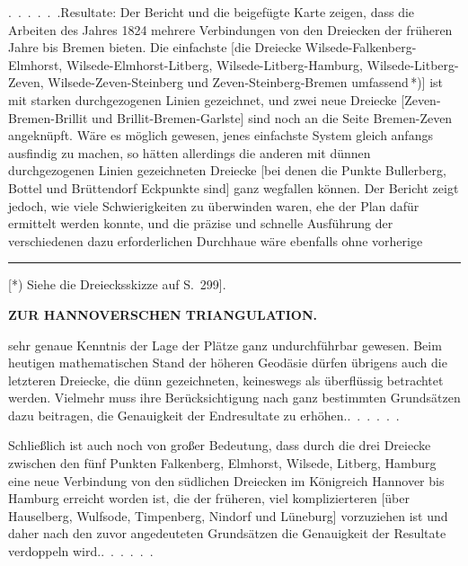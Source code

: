 \par\noindent\hspace*{\parindent}\mbox{.\ .\ .\ .\ .\ .}\quad Resultate: Der Bericht und die beigefügte Karte zeigen, dass
die Arbeiten des Jahres 1824 mehrere Verbindungen von den Dreiecken der
früheren Jahre bis Bremen bieten. Die einfachste [die Dreiecke
Wilsede-Falkenberg-Elmhorst, Wilsede-Elmhorst-Litberg, Wilsede-Litberg-Hamburg,
Wilsede-Litberg-Zeven, Wilsede-Zeven-Steinberg und Zeven-Steinberg-Bremen
umfassend\,*)] ist mit starken durchgezogenen Linien gezeichnet, und zwei neue
Dreiecke [Zeven-Bremen-Brillit und Brillit-Bremen-Garlste] sind noch an die
Seite Bremen-Zeven angeknüpft. Wäre es möglich gewesen, jenes einfachste
System gleich anfangs ausfindig zu machen, so hätten allerdings die anderen
mit dünnen durchgezogenen Linien gezeichneten Dreiecke [bei denen die Punkte
Bullerberg, Bottel und Brüttendorf Eckpunkte sind] ganz wegfallen können. Der
Bericht zeigt jedoch, wie viele Schwierigkeiten zu überwinden waren, ehe der
Plan dafür ermittelt werden konnte, und die präzise und schnelle Ausführung
der verschiedenen dazu erforderlichen Durchhaue wäre ebenfalls ohne vorherige
\par\vfill\noindent\rule{0.25\linewidth}{0.4pt}\par\smallskip
{\footnotesize\noindent\hspace*{\parindent}[*) Siehe die Dreiecksskizze auf S.~299].\par}
\clearpage
\noindent\null\hfill{\small\textbf{ZUR HANNOVERSCHEN TRIANGULATION.}}\hfill{}\par\medskip
\noindent sehr genaue Kenntnis der Lage der Plätze ganz undurchführbar gewesen.
Beim heutigen mathematischen Stand der höheren Geodäsie dürfen übrigens auch
die letzteren Dreiecke, die dünn gezeichneten, keineswegs als überflüssig
betrachtet werden. Vielmehr muss ihre Berücksichtigung nach ganz bestimmten
Grundsätzen dazu beitragen, die Genauigkeit der Endresultate zu erhöhen.\quad\mbox{.\ .\ .\ .\ .\ .}

Schließlich ist auch noch von großer Bedeutung, dass durch die drei Dreiecke
zwischen den fünf Punkten Falkenberg, Elmhorst, Wilsede, Litberg, Hamburg
eine neue Verbindung von den südlichen Dreiecken im Königreich Hannover bis
Hamburg erreicht worden ist, die der früheren, viel komplizierteren [über
Hauselberg, Wulfsode, Timpenberg, Nindorf und Lüneburg] vorzuziehen ist und
daher nach den zuvor angedeuteten Grundsätzen die Genauigkeit der Resultate
verdoppeln wird.\quad\mbox{.\ .\ .\ .\ .\ .}

